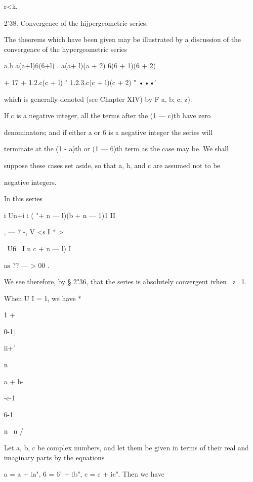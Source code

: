 r<k. 

2'38. Convergence of the hijpergeometric series. 

The theorems which have been given may be illustrated by a discussion 
of the convergence of the hypergeometric series 

  a.h a(a+l)6(6+l) . a(a+ l)(a + 2) 6(6 + 1)(6 + 2)   

  + 17 + 1.2.c(c + l)   "  1.2.3.c(c + l)(c + 2) " •••' 

which is generally denoted (see Chapter XIV) by F  a, b; c; z). 

If c is a negative integer, all the terms after the (1 — c)th have zero 

denominators; and if either a or 6 is a negative integer the series will 

terminate at the (1 - a)th or (1 — 6)th term as the case may be. We shall 

suppose these cases set aside, so that a, h, and c are assumed not to be 

negative integers. 

  In this series 

i Un+i i ( "+ n — l)(b + n — 1)1 II 

, — 7 -, V <s I   * > 

\ Ufi \ I n c + n — l) I 

as ?? — > 00 . 

We see therefore, by § 2"36, that the series is absolutely convergent ivhen 
\ z\ < l, and divergent ivhen |   | > 1. 

When U I = 1, we have * 






1 + 



0-1] 


ii+' 


n 


a + b- 


-c-1 



6-1 



n \ n / 






Let a, b, c be complex numbers, and let them be given in terms of their real 
and imaginary parts by the equations 

a = a + ia", 6 = 6' + ib", c = c + ic". 
Then we have 

